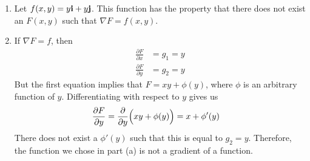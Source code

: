 \documentclass{article}
\begin{document}
\begin{enumerate}
\BEN
\item Let $f(x,y) = y \mathbf{i} + y \mathbf{j}$. This function has the property that there does not exist an $F(x,y)$ such that $\nabla F = f(x,y)$. 
\item If $\nabla F = f$, then 
\begin{align}
  \frac{\partial F}{\partial x} &= g_1 = y \\
  \frac{\partial F}{\partial y} &= g_2 = y 
\end{align}
But the first equation implies that $F=xy+\phi(y)$, where $\phi$ is an arbitrary function of $y$. Differentiating with respect to $y$ gives us
\begin{align}
  \frac{\partial F}{\partial y} &= \frac{\partial}{\partial y} \Big(xy+\phi(y)\Big) = x + \phi'(y)
\end{align}
There does not exist a $\phi'(y)$ such that this is equal to $g_2=y$. Therefore, the function we chose in part (a) is not a gradient of a function. 
\EEN

\end{enumerate}
\end{document}
